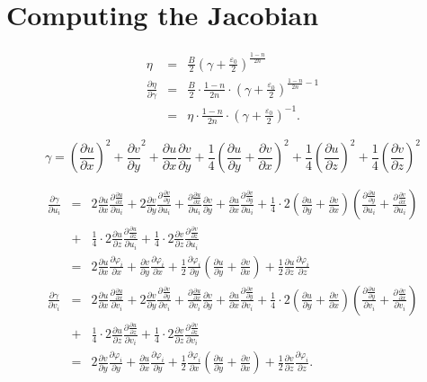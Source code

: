 \documentclass[draft]{article}
\begin{document}
\section{Computing the Jacobian}
\label{sec:jacobian}

\newcommand{\diff}[2]{\frac{\partial {#1}}{\partial {#2}}}
\newcommand{\dphi}[2][i]{\diff{\varphi_{#1}}{#2}}
\newcommand{\exponent}{\frac{1-n}{2n}}

\newcommand{\dux}{\diff{u}{x}}
\newcommand{\duy}{\diff{u}{y}}
\newcommand{\duz}{\diff{u}{z}}
\newcommand{\dvx}{\diff{v}{x}}
\newcommand{\dvy}{\diff{v}{y}}
\newcommand{\dvz}{\diff{v}{z}}
\newcommand{\deta}{\diff{\eta}{\gamma}}
\newcommand{\jw}{|J|\,w}
\newcommand{\dgdu}{\diff{\gamma}{u}}
\newcommand{\dgdv}{\diff{\gamma}{v}}
\newcommand{\p}[1]{\left(#1\right)}

\begin{eqnarray}
  \label{eq:3}
  \eta &=& \frac{B}{2} \p{\gamma + \frac{\varepsilon_{0}}{2}}^{\exponent}\\
  \diff{\eta}{\gamma} &=& \frac{B}{2} \cdot \exponent \cdot \p{\gamma + \frac{\varepsilon_{0}}{2} }^{\exponent-1}\\
  &=& \eta \cdot \exponent \cdot \p{\gamma + \frac{\varepsilon_{0}}{2} }^{-1}.
\end{eqnarray}

\begin{equation}
  \label{eq:2}
  \gamma = \p{\dux}^{2} + \dvy^{2} + \dux \dvy + \frac14 \p{\duy + \dvx}^{2} + \frac14 \p{\duz}^{2} + \frac14 \p{\dvz}^{2}
\end{equation}

\begin{eqnarray}
  \label{eq:1}
  \diff{\gamma}{u_{i}} &=& 2\dux \diff{\dux}{u_{i}} + 2\dvy \diff{\dvy}{u_{i}} + \diff{\dux}{u_{i}}\dvy + \dux\diff{\dvy}{u_{i}}
  +\frac 14 \cdot 2 \p{\duy + \dvx}\p{\diff{\duy}{u_{i}} + \diff{\dvx}{u_{i}} }\\
  &+& \frac 14 \cdot 2 \duz \diff{\duz}{u_{i}}
  + \frac 14 \cdot 2 \dvz \diff{\dvz}{u_{i}} \nonumber\\
  &=& 2\dux\dphi{x} + \dvy\dphi{x} + \frac 12 \dphi{y}\p{\duy + \dvx} + \frac 12 \duz \dphi{z}\\
  \diff{\gamma}{v_{i}} &=& 2\dux \diff{\dux}{v_{i}} + 2\dvy \diff{\dvy}{v_{i}} + \diff{\dux}{v_{i}}\dvy + \dux\diff{\dvy}{v_{i}}
  +\frac 14 \cdot 2 \p{\duy + \dvx}\p{\diff{\duy}{v_{i}} + \diff{\dvx}{v_{i}} }\\
  &+& \frac 14 \cdot 2 \duz \diff{\duz}{v_{i}} + \frac 14 \cdot 2 \dvz \diff{\dvz}{v_{i}} \nonumber\\
  &=& 2\dvy\dphi{y} + \dux\dphi{y} + \frac 12 \dphi{x}\p{\duy + \dvx} + \frac 12 \dvz \dphi{z}.
\end{eqnarray}
\end{document}
